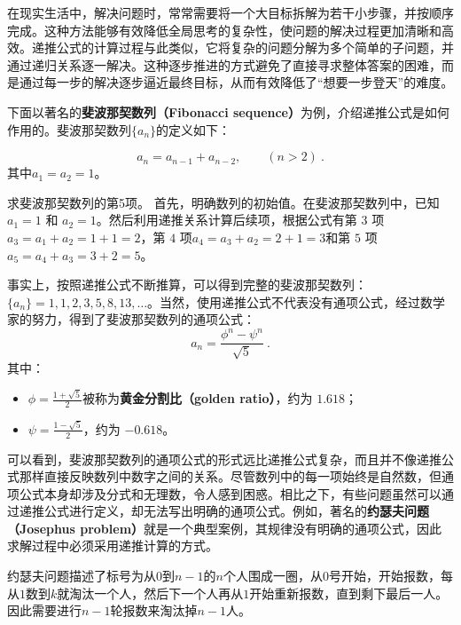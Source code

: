 在现实生活中，解决问题时，常常需要将一个大目标拆解为若干小步骤，并按顺序完成。这种方法能够有效降低全局思考的复杂性，使问题的解决过程更加清晰和高效。递推公式的计算过程与此类似，它将复杂的问题分解为多个简单的子问题，并通过递归关系逐一解决。这种逐步推进的方式避免了直接寻求整体答案的困难，而是通过每一步的解决逐步逼近最终目标，从而有效降低了“想要一步登天”的难度。

下面以著名的\textbf{斐波那契数列（Fibonacci sequence）}为例，介绍递推公式是如何作用的。斐波那契数列$\{a_n\}$的定义如下：

\begin{equation}
a_n = a_{n-1} + a_{n-2},\qquad(n>2)~.
\end{equation}
其中$a_1 =  a_2 =1$。

\begin{example}{求斐波那契数列的第5项。}
首先，明确数列的初始值。在斐波那契数列中，已知 $a_1 = 1$ 和 $a_2 = 1$。然后利用递推关系计算后续项，根据公式有第 $3$ 项$a_3 =a_1 +a_2= 1 + 1 = 2$，第 $4$ 项$a_4 = a_3 + a_2 = 2 + 1 = 3$和第 $5$ 项$a_5 = a_4 + a_3 = 3 + 2 = 5$。
\end{example}

事实上，按照递推公式不断推算，可以得到完整的斐波那契数列：$\{a_n\} = 1, 1, 2, 3, 5, 8, 13, \dots$。当然，使用递推公式不代表没有通项公式，经过数学家的努力，得到了斐波那契数列的通项公式：
\begin{equation}
a_n = \frac{\phi^n - \psi^n}{\sqrt{5}}~.
\end{equation}
其中：
\begin{itemize}
\item $\displaystyle\phi = \frac{1+\sqrt{5}}{2}$被称为\textbf{黄金分割比（golden ratio）}，约为 $1.618$；
\item $\displaystyle\psi = \frac{1-\sqrt{5}}{2}$，约为 $-0.618$。
\end{itemize}

可以看到，斐波那契数列的通项公式的形式远比递推公式复杂，而且并不像递推公式那样直接反映数列中数字之间的关系。尽管数列中的每一项始终是自然数，但通项公式本身却涉及分式和无理数，令人感到困惑。相比之下，有些问题虽然可以通过递推公式进行定义，却无法写出明确的通项公式。例如，著名的\textbf{约瑟夫问题（Josephus problem）}就是一个典型案例，其规律没有明确的通项公式，因此求解过程中必须采用递推计算的方式。

约瑟夫问题描述了标号为从$0$到$n-1$的$n$个人围成一圈，从$0$号开始，开始报数，每从$1$数到$k$就淘汰一个人，然后下一个人再从$1$开始重新报数，直到剩下最后一人。因此需要进行$n-1$轮报数来淘汰掉$n-1$人。

